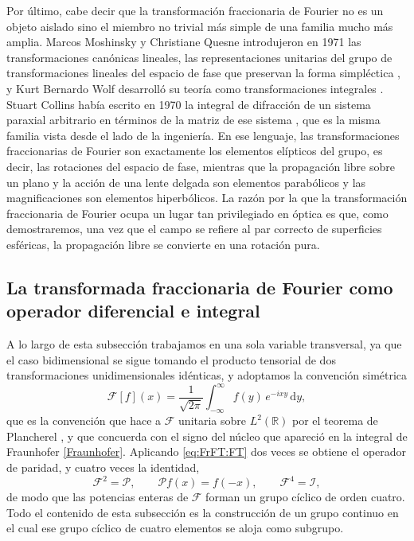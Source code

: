 		Por último, cabe decir que la transformación fraccionaria de Fourier no es un objeto aislado sino el miembro no trivial más simple de una familia mucho más amplia. Marcos Moshinsky y Christiane Quesne introdujeron en 1971 las transformaciones canónicas lineales, las representaciones unitarias del grupo de transformaciones lineales del espacio de fase que preservan la forma simpléctica \citep{moshinsky1971linear}, y Kurt Bernardo Wolf desarrolló su teoría como transformaciones integrales \citep{wolf1979integral}. Stuart Collins había escrito en 1970 la integral de difracción de un sistema paraxial arbitrario en términos de la matriz de ese sistema \citep{collins1970lens}, que es la misma familia vista desde el lado de la ingeniería. En ese lenguaje, las transformaciones fraccionarias de Fourier son exactamente los elementos elípticos del grupo, es decir, las rotaciones del espacio de fase, mientras que la propagación libre sobre un plano y la acción de una lente delgada son elementos parabólicos y las magnificaciones son elementos hiperbólicos. La razón por la que la transformación fraccionaria de Fourier ocupa un lugar tan privilegiado en óptica es que, como demostraremos, una vez que el campo se refiere al par correcto de superficies esféricas, la propagación libre se convierte en una rotación pura.

	\subsection{La transformada fraccionaria de Fourier como operador diferencial e integral}

		A lo largo de esta subsección trabajamos en una sola variable transversal, ya que el caso bidimensional se sigue tomando el producto tensorial de dos transformaciones unidimensionales idénticas, y adoptamos la convención simétrica
		\begin{equation}\label{eq:FrFT:FT}
			\mathcal{F}[f](x) = \frac{1}{\sqrt{2\pi}}\int_{-\infty}^{\infty} f(y)\,e^{-ixy}\,\mathrm{d}y,
		\end{equation}
		que es la convención que hace a $\mathcal{F}$ unitaria sobre $L^2(\mathbb{R})$ por el teorema de Plancherel \citeyearpar{plancherel1910contribution}, y que concuerda con el signo del núcleo que apareció en la integral de Fraunhofer \eqref{Fraunhofer}. Aplicando \eqref{eq:FrFT:FT} dos veces se obtiene el operador de paridad, y cuatro veces la identidad,
		\begin{equation}\label{eq:FrFT:Powers}
			\mathcal{F}^{2} = \mathcal{P}, \qquad \mathcal{P}f(x) = f(-x), \qquad \mathcal{F}^{4} = \mathcal{I},
		\end{equation}
		de modo que las potencias enteras de $\mathcal{F}$ forman un grupo cíclico de orden cuatro. Todo el contenido de esta subsección es la construcción de un grupo continuo en el cual ese grupo cíclico de cuatro elementos se aloja como subgrupo.

